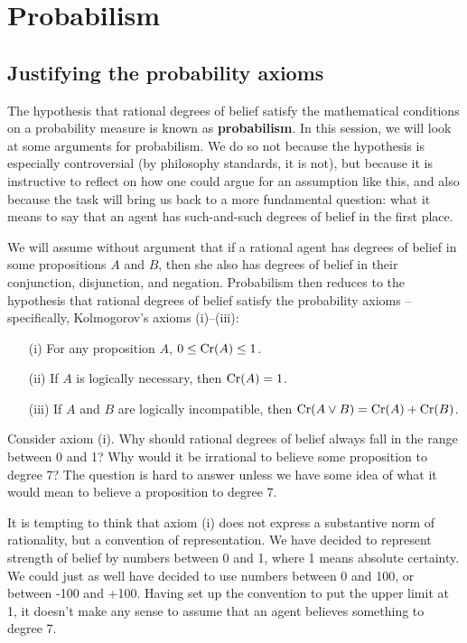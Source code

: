 \chapter{Probabilism}\label{ch:probabilism}

\section{Justifying the probability axioms}

The hypothesis that rational degrees of belief satisfy the
mathematical conditions on a probability measure is known as
\textbf{probabilism}. In this session, we will look at some arguments
for probabilism. We do so not because the hypothesis is especially
controversial (by philosophy standards, it is not), but because it is
instructive to reflect on how one could argue for an assumption like
this, and also because the task will bring us back to a more
fundamental question: what it means to say that an agent has
such-and-such degrees of belief in the first place.

We will assume without argument that if a rational agent has degrees
of belief in some propositions $A$ and $B$, then she also has degrees
of belief in their conjunction, disjunction, and negation. Probabilism
then reduces to the hypothesis that rational degrees of belief satisfy
the probability axioms -- specifically, Kolmogorov's axioms (i)--(iii):
\begin{itemize}
\itemsep0em 
\item[(i)] For any proposition $A$, $0 \leq \text{Cr}(A) \leq 1$.
\item[(ii)] If $A$ is logically necessary, then $\text{Cr}(A) = 1$.
\item[(iii)] If $A$ and $B$ are logically incompatible, then $\text{Cr}(A \lor B) = \text{Cr}(A) + \text{Cr}(B)$.
\end{itemize}

Consider axiom (i). Why should rational degrees of belief always fall
in the range between 0 and 1? Why would it be irrational to believe
some proposition to degree 7? The question is hard to answer unless we
have some idea of what it would mean to believe a proposition to
degree 7.

It is tempting to think that axiom (i) does not express a substantive
norm of rationality, but a convention of representation. We have
decided to represent strength of belief by numbers between 0 and 1,
where 1 means absolute certainty. We could just as well have decided
to use numbers between 0 and 100, or between -100 and +100. Having set
up the convention to put the upper limit at 1, it doesn't make any
sense to assume that an agent believes something to degree 7.

